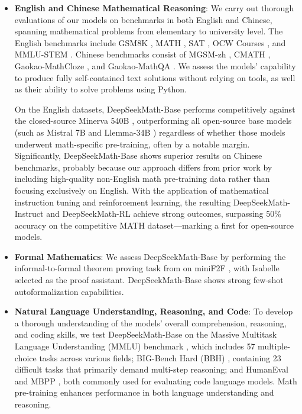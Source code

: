 \begin{itemize}[topsep=0pt]
    \item \textbf{English and Chinese Mathematical Reasoning}: We carry out thorough evaluations of our models on benchmarks in both English and Chinese, spanning mathematical problems from elementary to university level. The English benchmarks include GSM8K \citep{gsm8k}, MATH \citep{MATH}, SAT \citep{llemma}, OCW Courses \citep{minerva}, and MMLU-STEM \citep{mmlu}. Chinese benchmarks consist of MGSM-zh \citep{mgsm}, CMATH \citep{wei2023cmath}, Gaokao-MathCloze \citep{agieval}, and Gaokao-MathQA \citep{agieval}. We assess the models' capability to produce fully self-contained text solutions without relying on tools, as well as their ability to solve problems using Python.

    On the English datasets, DeepSeekMath-Base performs competitively against the closed-source Minerva 540B \citep{minerva}, outperforming all open-source base models (such as Mistral 7B \citep{mistral} and Llemma-34B \citep{llemma}) regardless of whether those models underwent math-specific pre-training, often by a notable margin. Significantly, DeepSeekMath-Base shows superior results on Chinese benchmarks, probably because our approach differs from prior work \citep{minerva,llemma} by including high-quality non-English math pre-training data rather than focusing exclusively on English. With the application of mathematical instruction tuning and reinforcement learning, the resulting DeepSeekMath-Instruct and DeepSeekMath-RL achieve strong outcomes, surpassing 50\% accuracy on the competitive MATH dataset—marking a first for open-source models.
\end{itemize}

\begin{itemize}
    \item \textbf{Formal Mathematics}: We assess DeepSeekMath-Base by performing the informal-to-formal theorem proving task from \citep{dsp_proof} on miniF2F \citep{minif2f}, with Isabelle \citep{isabelle} selected as the proof assistant. DeepSeekMath-Base shows strong few-shot autoformalization capabilities.
    \item \textbf{Natural Language Understanding, Reasoning, and Code}: To develop a thorough understanding of the models' overall comprehension, reasoning, and coding skills, we test DeepSeekMath-Base on the Massive Multitask Language Understanding (MMLU) benchmark \citep{mmlu}, which includes 57 multiple-choice tasks across various fields; BIG-Bench Hard (BBH) \citep{bbh}, containing 23 difficult tasks that primarily demand multi-step reasoning; and HumanEval \citep{codex} and MBPP \citep{mbpp}, both commonly used for evaluating code language models. Math pre-training enhances performance in both language understanding and reasoning.
\end{itemize}

